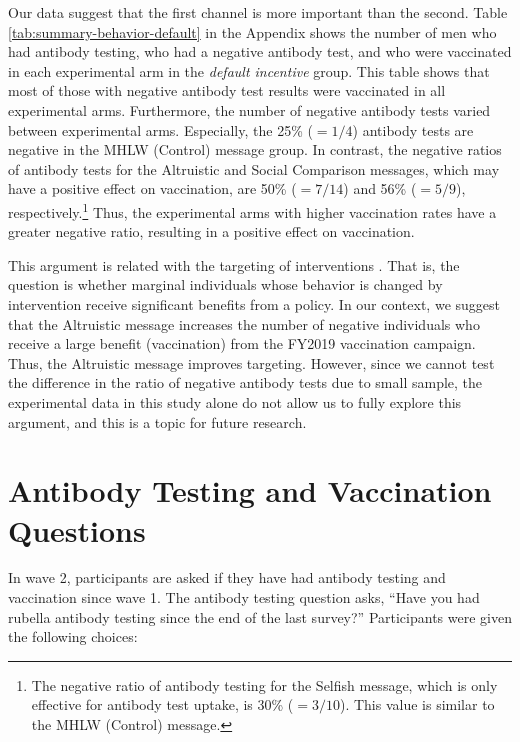 \documentclass[
]{article}
\begin{document}
Our data suggest that the first channel is more important than the second. Table \ref{tab:summary-behavior-default} in the Appendix shows the number of men who had antibody testing, who had a negative antibody test, and who were vaccinated in each experimental arm in the \emph{default incentive} group. This table shows that most of those with negative antibody test results were vaccinated in all experimental arms. Furthermore, the number of negative antibody tests varied between experimental arms. Especially, the 25\% (\(=1/4\)) antibody tests are negative in the MHLW (Control) message group. In contrast, the negative ratios of antibody tests for the Altruistic and Social Comparison messages, which may have a positive effect on vaccination, are 50\% (\(=7/14\)) and 56\% (\(=5/9\)), respectively.\footnote{The negative ratio of antibody testing for the Selfish message, which is only effective for antibody test uptake, is 30\% (\(=3/10\)). This value is similar to the MHLW (Control) message.} Thus, the experimental arms with higher vaccination rates have a greater negative ratio, resulting in a positive effect on vaccination.

This argument is related with the targeting of interventions \citep[e.g.,][]{Finkelstein2019}. That is, the question is whether marginal individuals whose behavior is changed by intervention receive significant benefits from a policy. In our context, we suggest that the Altruistic message increases the number of negative individuals who receive a large benefit (vaccination) from the FY2019 vaccination campaign. Thus, the Altruistic message improves targeting. However, since we cannot test the difference in the ratio of negative antibody tests due to small sample, the experimental data in this study alone do not allow us to fully explore this argument, and this is a topic for future research.

\clearpage

\hypertarget{appendix-appendix}{%
\appendix}


\hypertarget{question}{%
\section{Antibody Testing and Vaccination Questions}\label{question}}

In wave 2, participants are asked if they have had antibody testing and vaccination since wave 1. The antibody testing question asks, ``Have you had rubella antibody testing since the end of the last survey?''
Participants were given the following choices:
\end{document}
